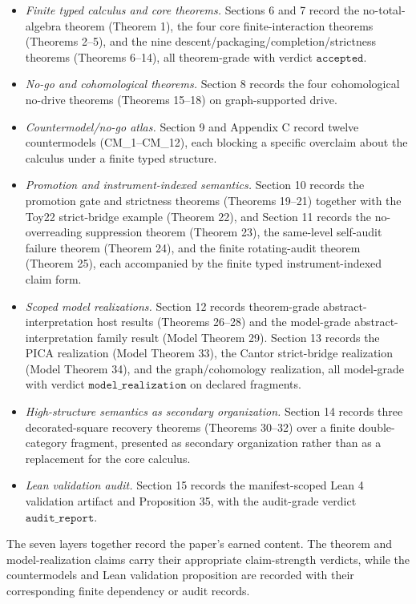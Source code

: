 \documentclass[11pt]{article}
\providecommand{\tightlist}{}
\theoremstyle{definition}
\begin{document}
\begin{itemize}
\tightlist
\item
  \emph{Finite typed calculus and core theorems.} Sections 6 and 7 record the no-total-algebra theorem (Theorem 1), the four core finite-interaction theorems (Theorems 2--5), and the nine descent/packaging/completion/strictness theorems (Theorems 6--14), all theorem-grade with verdict \(\texttt{accepted}\).
\item
  \emph{No-go and cohomological theorems.} Section 8 records the four cohomological no-drive theorems (Theorems 15--18) on graph-supported drive.
\item
  \emph{Countermodel/no-go atlas.} Section 9 and Appendix C record twelve countermodels (CM\_1--CM\_12), each blocking a specific overclaim about the calculus under a finite typed structure.
\item
  \emph{Promotion and instrument-indexed semantics.} Section 10 records the promotion gate and strictness theorems (Theorems 19--21) together with the Toy22 strict-bridge example (Theorem 22), and Section 11 records the no-overreading suppression theorem (Theorem 23), the same-level self-audit failure theorem (Theorem 24), and the finite rotating-audit theorem (Theorem 25), each accompanied by the finite typed instrument-indexed claim form.
\item
  \emph{Scoped model realizations.} Section 12 records theorem-grade abstract-interpretation host results (Theorems 26--28) and the model-grade abstract-interpretation family result (Model Theorem 29). Section 13 records the PICA realization (Model Theorem 33), the Cantor strict-bridge realization (Model Theorem 34), and the graph/cohomology realization, all model-grade with verdict \(\texttt{model\_realization}\) on declared fragments.
\item
  \emph{High-structure semantics as secondary organization.} Section 14 records three decorated-square recovery theorems (Theorems 30--32) over a finite double-category fragment, presented as secondary organization rather than as a replacement for the core calculus.
\item
  \emph{Lean validation audit.} Section 15 records the manifest-scoped Lean 4 validation artifact and Proposition 35, with the audit-grade verdict \(\texttt{audit\_report}\).
\end{itemize}

The seven layers together record the paper's earned content. The theorem and model-realization claims carry their appropriate claim-strength verdicts, while the countermodels and Lean validation proposition are recorded with their corresponding finite dependency or audit records.
\end{document}
